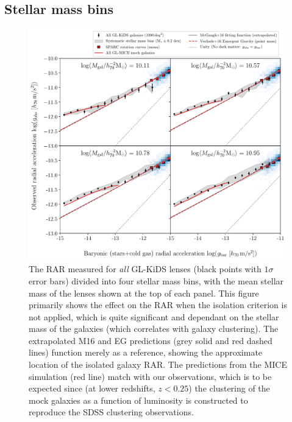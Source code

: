 \documentclass[usenatbib]{mnras}
\begin{document}
\subsection{Stellar mass bins}
\label{sec:results_Mstarbins}

\begin{figure}
	\includegraphics[width=\textwidth]{Figures/RAR_KiDS+MICE+Verlinde_4-massbins_all.pdf}
	\caption{The RAR measured for \emph{all} GL-KiDS lenses (black points with $1\sigma$ error bars) divided into four stellar mass bins, with the mean stellar mass of the lenses shown at the top of each panel. This figure primarily shows the effect on the RAR when the isolation criterion is not applied, which is quite significant and dependant on the stellar mass of the galaxies (which correlates with galaxy clustering). The extrapolated M16 and EG predictions (grey solid and red dashed lines) function merely as a reference, showing the approximate location of the isolated galaxy RAR. The predictions from the MICE simulation (red line) match with our observations, which is to be expected since (at lower redshifts, $z<0.25$) the clustering of the mock galaxies as a function of luminosity is constructed to reproduce the SDSS clustering observations.}
	\label{fig:RAR_kids_mice_mstarbins_all}
\end{figure}
\end{document}
